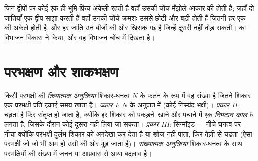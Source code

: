 \begin{example}[फ़िंचों में अभिलक्षण विस्थापन]\label{ex:b1:species-interactions:finches}
जिन द्वीपों पर कोई एक ही भूमि-फ़िंच अकेली रहती है वहाँ उसकी चोंच मँझोले
आकार की होती है; जहाँ दो जातियाँ एक द्वीप साझा करती हैं वहाँ उनकी चोंचें
क्रमशः उससे छोटी और बड़ी होती हैं जितनी हर एक की अकेले होती है, और हर
जाति उन बीजों की ओर खिसक गई है जिन्हें दूसरी नहीं तोड़ सकती।  का
विभाजन विकास ने किया, और वह विभाजन चोंच में दिखता है।
\end{example}

\section{परभक्षण और शाकभक्षण}

\begin{definition}[क्रियात्मक अनुक्रिया]\label{def:b1:species-interactions:functional}
किसी परभक्षी की \emph{क्रियात्मक अनुक्रिया} शिकार-घनत्व $N$ के फलन के रूप
में वह संख्या है जितने शिकार एक परभक्षी प्रति इकाई समय खाता है।
\emph{प्रकार I}: $N$ के अनुपात में (कोई निस्यंद-भक्षी)। \emph{प्रकार II}:
चढ़ता है फिर संतृप्त हो जाता है, क्योंकि हर शिकार को पकड़ने, खाने और
पचाने में एक \emph{निपटान काल} $h$ लगता है, जिसके दौरान कोई दूसरा नहीं
लिया जा सकता। \emph{प्रकार III}: सिग्मॉइड --- नीचे घनत्व पर नीचा क्योंकि
परभक्षी दुर्लभ शिकार को अनदेखा कर देता है या खोज नहीं पाता, फिर तेज़ी से
चढ़ता (ऐसा परभक्षी जो जो भी आम हो उसी की ओर मुड़ जाता है)।
\emph{संख्यात्मक अनुक्रिया} शिकार-घनत्व के साथ परभक्षियों की संख्या में
जनन या आप्रवास से आया बदलाव है।
\end{definition}

